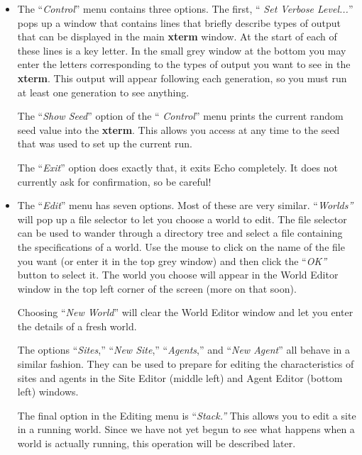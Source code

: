 \begin{itemize}

\item
The ``{\sl Control}'' menu contains three options. The first, ``{\sl
Set Verbose Level...}''  pops up a window that
contains lines that briefly describe types of output that can be
displayed in the main {\bf xterm} window. At the start of each of
these lines is a key letter. In the small grey window at the bottom
you may enter the letters corresponding to the types of output you
want to see in the {\bf xterm}. This output will appear following each
generation, so you must run at least one generation to see anything.

The ``{\sl Show Seed}''  option of the ``{\sl
Control}'' menu prints the current random seed value into the {\bf
xterm}. This allows you access at any time to the seed that was used
to set up the current run.

The ``{\sl Exit}'' option does exactly that, it
exits Echo completely. It does not currently ask for confirmation, so
be careful!

\item
The ``{\sl Edit}''  menu has seven
options. Most of these are very similar.  ``{\sl Worlds''}
 will pop up
a file selector to let you choose a world to edit. The file selector
can be used to wander through a directory tree and select a file
containing the specifications of a world. Use the mouse to click on
the name of the file you want (or enter it in the top grey window) and
then click the ``{\sl OK''} button to select it. The world you choose
will appear in the World Editor window in the top left corner of the
screen (more on that soon).

Choosing ``{\sl New World}''  will clear the World
Editor window and let you enter the details of a fresh world.

The options ``{\sl Sites},''  ``{\sl New Site},''
 ``{\sl Agents},'' 
and ``{\sl New Agent}''  all behave in a
similar fashion. They can be used to prepare for editing the
characteristics of sites and agents in the Site Editor (middle left)
and Agent Editor (bottom left) windows.

The final option in the Editing menu is ``{\sl Stack.''}
  This allows
you to edit a site in a running world. Since we have not yet begun to
see what happens when a world is actually running, this operation will
be described later.


\end{itemize}
